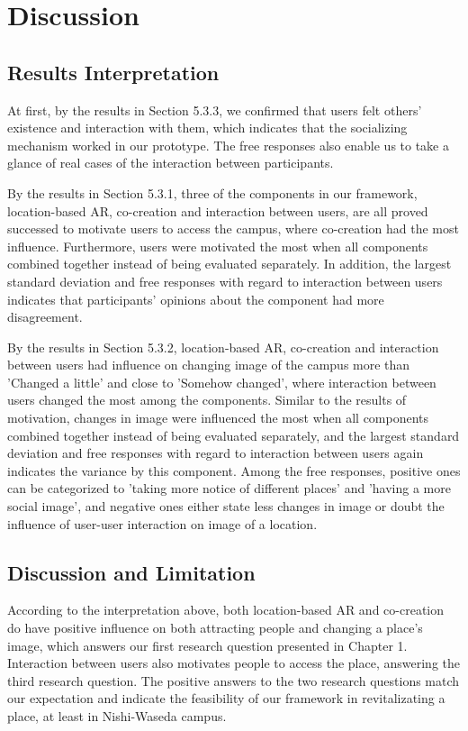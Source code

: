 \chapter{Discussion}\label{ch:6}

\section{Results Interpretation}

At first, by the results in Section 5.3.3, we confirmed that users felt others' existence and interaction with them, which indicates that the socializing mechanism worked in our prototype.
The free responses also enable us to take a glance of real cases of the interaction between participants.

By the results in Section 5.3.1, three of the components in our framework, location-based AR, co-creation and interaction between users, are all proved successed to motivate users to access the campus, where co-creation had the most influence.
Furthermore, users were motivated the most when all components combined together instead of being evaluated separately.
In addition, the largest standard deviation and free responses with regard to interaction between users indicates that participants' opinions about the component had more disagreement.

By the results in Section 5.3.2, location-based AR, co-creation and interaction between users had influence on changing image of the campus more than 'Changed a little' and close to 'Somehow changed',
where interaction between users changed the most among the components.
Similar to the results of motivation, changes in image were influenced the most when all components combined together instead of being evaluated separately,
and the largest standard deviation and free responses with regard to interaction between users again indicates the variance by this component.
Among the free responses, positive ones can be categorized to 'taking more notice of different places' and 'having a more social image',
and negative ones either state less changes in image or doubt the influence of user-user interaction on image of a location.

\section{Discussion and Limitation}

According to the interpretation above, both location-based AR and co-creation do have positive influence on both attracting people and changing a place's image, which answers our first research question presented in Chapter 1.
Interaction between users also motivates people to access the place, answering the third research question.
The positive answers to the two research questions match our expectation and indicate the feasibility of our framework in revitalizating a place, at least in Nishi-Waseda campus.

